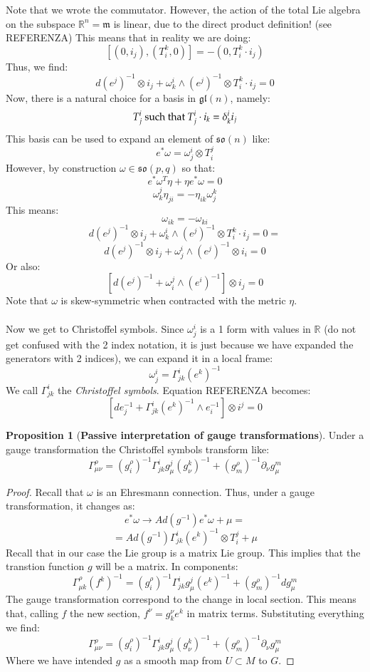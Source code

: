 \documentclass[12pt,a4paper]{report}
\theoremstyle{definition}
\theoremstyle{Theorem}
\newtheorem{Prop}[Def]{Proposition}
\theoremstyle{break}
\theoremstyle{definition}
\begin{document}
		Note that we wrote the commutator. However, the action of the total Lie algebra on the subspace $\mathbb{R}^n=\mathfrak{m}$ is linear, due to the direct product definition! (see REFERENZA) This means that in reality we are doing:
		$$[(0,i_j),(T^k_i,0)]=-(0,T_i^k\cdot i_j)$$
		Thus, we find:
		$$d(e^j)^{-1}\otimes i_j+ \omega^i_k\wedge (e^j)^{-1} \otimes T_i^k\cdot i_j=0$$
		Now, there is a natural choice for a basis in $\mathfrak{gl}(n)$, namely:
		$$T^i_j\hbox{ such that }T^i_j\cdot i_k=\delta_k^i i_j$$
		This basis can be used to expand an element of $\mathfrak{so}(n)$ like:
		$$e^*\omega=\omega^i_j\otimes T^j_i$$
		However, by construction $\omega\in\mathfrak{so}(p,q)$ so that:
		$$e^*\omega^T\eta+\eta e^*\omega=0$$
		$$\omega^j_k\eta_{ji}=-\eta_{ik}\omega^k_j$$ 
		This means:
		$$\omega_{ik}=-\omega_{ki}$$
		$$d(e^j)^{-1}\otimes i_j+ \omega^i_k\wedge (e^j)^{-1} \otimes T_i^k\cdot i_j=0=$$
		$$d(e^j)^{-1}\otimes i_j+ \omega^i_j\wedge (e^j)^{-1} \otimes i_i=0$$
		Or also:
		$$[d(e^j)^{-1}+ \omega_i^j\wedge (e^i)^{-1} ]\otimes i_j=0$$
		Note that $\omega$ is skew-symmetric when contracted with the metric $\eta$.\\
		\\
		Now we get to Christoffel symbols. Since $\omega^i_j$ is a 1 form with values in $\mathbb{R}$ (do not get confused with the 2 index notation, it is just because we have expanded the generators with 2 indices), we can expand it in a local frame:
		$$\omega^i_j=\Gamma^i_{jk}(e^k)^{-1}$$
		We call $\Gamma^i_{jk}$ the \textit{Christoffel symbols}. Equation REFERENZA becomes:
		$$[de_j^{-1}+ \Gamma^i_{jk}(e^k)^{-1}\wedge e_i^{-1}]\otimes i^j=0$$
		\begin{Prop} [\textbf{Passive interpretation of gauge transformations}]
			Under a gauge transformation the Christoffel symbols transform like:
			$$\Gamma^\rho_{\mu\nu}=(g^\rho_i)^{-1}\Gamma^i_{jk}g^j_\mu (g^k_\nu)^{-1}+(g_m^\rho)^{-1}\partial_\nu g^m_{\mu}$$
		\end{Prop}
		\begin{proof}
			Recall that $\omega$ is an Ehresmann connection. Thus, under a gauge transformation, it changes as:
			$$e^*\omega\rightarrow Ad(g^{-1})e^*\omega+\mu=$$
			$$=Ad(g^{-1})\Gamma^i_{jk}(e^k)^{-1}\otimes T^j_i+\mu$$
			Recall that in our case the Lie group is a matrix Lie group. This implies that the transtion function $g$ will be a matrix. In components:
			$$\Gamma^\rho_{\mu k}(f^k)^{-1}=(g^\rho_i)^{-1}\Gamma^i_{jk}g^j_\mu (e^k)^{-1}+(g_m^\rho)^{-1}dg^m_{\mu}$$
			The gauge transformation correspond to the change in local section. This means that, calling $f$ the new section, $f^\nu=g^\nu_ke^k$ in matrix terms. Substituting everything we find:
			$$\Gamma^\rho_{\mu\nu}=(g^\rho_i)^{-1}\Gamma^i_{jk}g^j_\mu (g^k_\nu)^{-1}+(g_m^\rho)^{-1}\partial_\nu g^m_{\mu}$$
			Where we have intended $g$ as a smooth map from $U\subset M$ to $G$.
		\end{proof}
\end{document}
